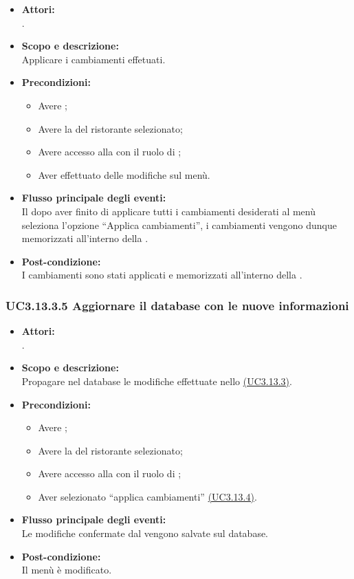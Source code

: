 \begin{itemize}
	\item \textbf{Attori:}
	\\.
	\item \textbf{Scopo e descrizione:} 
	\\Applicare i cambiamenti effetuati.
	\item \textbf{Precondizioni:}
	\begin{itemize}
		\item Avere ;
		\item Avere la  del ristorante selezionato;
		\item Avere accesso alla  con il ruolo di ;
		\item Aver effettuato delle modifiche sul menù.
	\end{itemize}
	\item \textbf{Flusso principale degli eventi:}
	\\Il {} dopo aver finito di applicare tutti i cambiamenti desiderati al menù seleziona l'opzione “Applica cambiamenti”, i cambiamenti vengono dunque memorizzati all'interno della .
	\item \textbf{Post-condizione:}
	\\I cambiamenti sono stati applicati e memorizzati all'interno della .
\end{itemize}

\subsubsection{UC3.13.3.5 Aggiornare il database con le nuove informazioni} \label{UC3.13.3.5}

\begin{itemize}
	\item \textbf{Attori:}
	\\.
	\item \textbf{Scopo e descrizione:} 
	\\Propagare nel database le modifiche effettuate nello \hyperref[UC3.13.3]{(UC3.13.3)}.
	\item \textbf{Precondizioni:}
	\begin{itemize}
		\item Avere ;
		\item Avere la  del ristorante selezionato;
		\item Avere accesso alla  con il ruolo di ;
		\item Aver selezionato “applica cambiamenti” \hyperref[UC3.13.4]{(UC3.13.4)}.
	\end{itemize}
	\item \textbf{Flusso principale degli eventi:}
	\\Le modifiche confermate dal  vengono salvate sul database.
	\item \textbf{Post-condizione:}
	\\Il menù è modificato.
\end{itemize}

